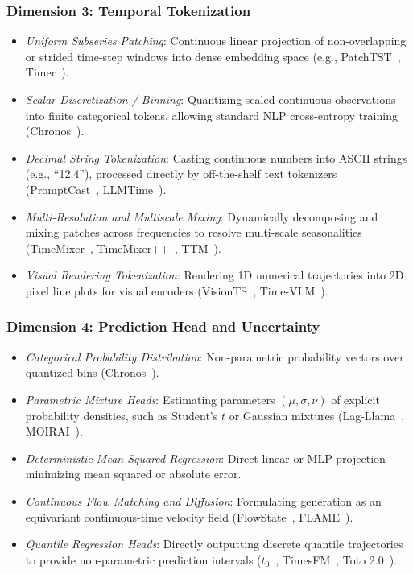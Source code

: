 \subsubsection{Dimension 3: Temporal Tokenization}
\begin{itemize}[leftmargin=*]
    \item \emph{Uniform Subseries Patching}: Continuous linear projection of non-overlapping or strided time-step windows into dense embedding space (e.g., PatchTST~\cite{nie2023patchtst}, Timer~\cite{liu2024timer}).
    \item \emph{Scalar Discretization / Binning}: Quantizing scaled continuous observations into finite categorical tokens, allowing standard NLP cross-entropy training (Chronos~\cite{ansari2024chronos}).
    \item \emph{Decimal String Tokenization}: Casting continuous numbers into ASCII strings (e.g., ``12.4''), processed directly by off-the-shelf text tokenizers (PromptCast~\cite{xue2022promptcast}, LLMTime~\cite{gruver2023llmtime}).
    \item \emph{Multi-Resolution and Multiscale Mixing}: Dynamically decomposing and mixing patches across frequencies to resolve multi-scale seasonalities (TimeMixer~\cite{wang2024timemixer}, TimeMixer++~\cite{wang2024timemixerplus}, TTM~\cite{ekambaram2024ttm}).
    \item \emph{Visual Rendering Tokenization}: Rendering 1D numerical trajectories into 2D pixel line plots for visual encoders (VisionTS~\cite{chen2024visionts}, Time-VLM~\cite{zhong2025timevlm}).
\end{itemize}

\subsubsection{Dimension 4: Prediction Head and Uncertainty}
\begin{itemize}[leftmargin=*]
    \item \emph{Categorical Probability Distribution}: Non-parametric probability vectors over quantized bins (Chronos~\cite{ansari2024chronos}).
    \item \emph{Parametric Mixture Heads}: Estimating parameters $(\mu, \sigma, \nu)$ of explicit probability densities, such as Student's $t$ or Gaussian mixtures (Lag-Llama~\cite{rasul2023lagllama}, MOIRAI~\cite{woo2024moirai}).
    \item \emph{Deterministic Mean Squared Regression}: Direct linear or MLP projection minimizing mean squared or absolute error.
    \item \emph{Continuous Flow Matching and Diffusion}: Formulating generation as an equivariant continuous-time velocity field (FlowState~\cite{king2025flowstate}, FLAME~\cite{wu2025flame}).
    \item \emph{Quantile Regression Heads}: Directly outputting discrete quantile trajectories to provide non-parametric prediction intervals ($t_0$~\cite{meyer2026t0}, TimesFM~\cite{das2024timesfm}, Toto 2.0~\cite{datadog2026toto2}).
\end{itemize}

